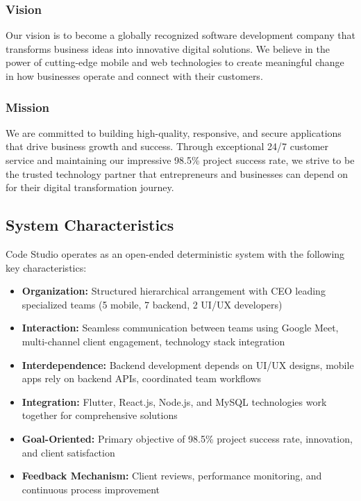 \documentclass[12pt,a4paper]{article}
\begin{document}
\subsubsection{Vision}
Our vision is to become a globally recognized software development company that transforms business ideas into innovative digital solutions. We believe in the power of cutting-edge mobile and web technologies to create meaningful change in how businesses operate and connect with their customers.

\subsubsection{Mission}
We are committed to building high-quality, responsive, and secure applications that drive business growth and success. Through exceptional 24/7 customer service and maintaining our impressive 98.5\% project success rate, we strive to be the trusted technology partner that entrepreneurs and businesses can depend on for their digital transformation journey.


\subsection{System Characteristics}

Code Studio operates as an open-ended deterministic system with the following key characteristics:

\begin{itemize}
    \item \textbf{Organization:} Structured hierarchical arrangement with CEO leading specialized teams (5 mobile, 7 backend, 2 UI/UX developers)
    \item \textbf{Interaction:} Seamless communication between teams using Google Meet, multi-channel client engagement, technology stack integration
    \item \textbf{Interdependence:} Backend development depends on UI/UX designs, mobile apps rely on backend APIs, coordinated team workflows
    \item \textbf{Integration:} Flutter, React.js, Node.js, and MySQL technologies work together for comprehensive solutions
    \item \textbf{Goal-Oriented:} Primary objective of 98.5\% project success rate, innovation, and client satisfaction
    \item \textbf{Feedback Mechanism:} Client reviews, performance monitoring, and continuous process improvement
\end{itemize}
\end{document}
